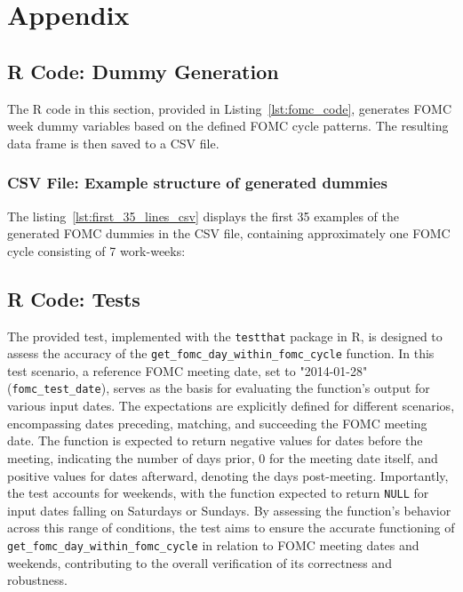 \chapter{Appendix}

\section{R Code: Dummy Generation}
\label{app:fomc_code}

The R code in this section, provided in Listing~\ref{lst:fomc_code}, generates FOMC week dummy variables based on the defined FOMC cycle patterns. The resulting data frame is then saved to a CSV file.



\subsection{CSV File: Example structure of generated dummies}
\label{app:first_35_lines_csv}

The listing~\ref{lst:first_35_lines_csv} displays the first 35 examples of the generated FOMC dummies in the CSV file,  containing approximately one FOMC cycle consisting of 7 work-weeks:



\section{R Code: Tests}
\label{app:fomc_code}

The provided test, implemented with the \texttt{testthat} package in R, is designed to assess the accuracy of the \texttt{get\_fomc\_day\_within\_fomc\_cycle} function. In this test scenario, a reference FOMC meeting date, set to "2014-01-28" (\texttt{fomc\_test\_date}), serves as the basis for evaluating the function's output for various input dates. The expectations are explicitly defined for different scenarios, encompassing dates preceding, matching, and succeeding the FOMC meeting date. The function is expected to return negative values for dates before the meeting, indicating the number of days prior, 0 for the meeting date itself, and positive values for dates afterward, denoting the days post-meeting. Importantly, the test accounts for weekends, with the function expected to return \texttt{NULL} for input dates falling on Saturdays or Sundays. By assessing the function's behavior across this range of conditions, the test aims to ensure the accurate functioning of \texttt{get\_fomc\_day\_within\_fomc\_cycle} in relation to FOMC meeting dates and weekends, contributing to the overall verification of its correctness and robustness.


